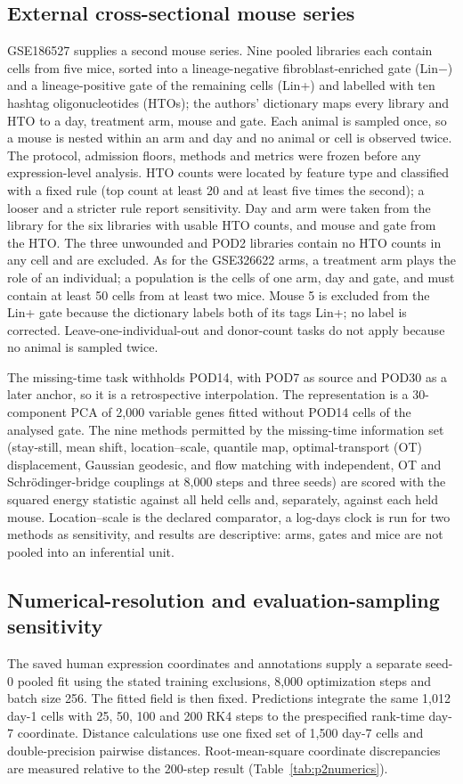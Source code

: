 \subsection{External cross-sectional mouse series}
GSE186527 supplies a second mouse series. Nine pooled libraries each contain cells from five mice, sorted into a lineage-negative fibroblast-enriched gate (Lin$-$) and a lineage-positive gate of the remaining cells (Lin+) and labelled with ten hashtag oligonucleotides (HTOs); the authors' dictionary maps every library and HTO to a day, treatment arm, mouse and gate. Each animal is sampled once, so a mouse is nested within an arm and day and no animal or cell is observed twice. The protocol, admission floors, methods and metrics were frozen before any expression-level analysis. HTO counts were located by feature type and classified with a fixed rule (top count at least 20 and at least five times the second); a looser and a stricter rule report sensitivity. Day and arm were taken from the library for the six libraries with usable HTO counts, and mouse and gate from the HTO. The three unwounded and POD2 libraries contain no HTO counts in any cell and are excluded. As for the GSE326622 arms, a treatment arm plays the role of an individual; a population is the cells of one arm, day and gate, and must contain at least 50 cells from at least two mice. Mouse 5 is excluded from the Lin+ gate because the dictionary labels both of its tags Lin+; no label is corrected. Leave-one-individual-out and donor-count tasks do not apply because no animal is sampled twice.

The missing-time task withholds POD14, with POD7 as source and POD30 as a later anchor, so it is a retrospective interpolation. The representation is a 30-component PCA of 2,000 variable genes fitted without POD14 cells of the analysed gate. The nine methods permitted by the missing-time information set (stay-still, mean shift, location--scale, quantile map, optimal-transport (OT) displacement, Gaussian geodesic, and flow matching with independent, OT and Schr\"odinger-bridge couplings at 8,000 steps and three seeds) are scored with the squared energy statistic against all held cells and, separately, against each held mouse. Location--scale is the declared comparator, a log-days clock is run for two methods as sensitivity, and results are descriptive: arms, gates and mice are not pooled into an inferential unit.

\subsection{Numerical-resolution and evaluation-sampling sensitivity}
The saved human expression coordinates and annotations supply a separate seed-0 pooled fit using the stated training exclusions, 8,000 optimization steps and batch size 256. The fitted field is then fixed. Predictions integrate the same 1,012 day-1 cells with 25, 50, 100 and 200 RK4 steps to the prespecified rank-time day-7 coordinate. Distance calculations use one fixed set of 1,500 day-7 cells and double-precision pairwise distances. Root-mean-square coordinate discrepancies are measured relative to the 200-step result (Table~\ref{tab:p2numerics}).

